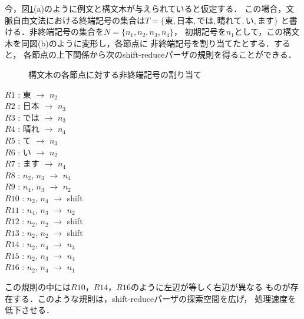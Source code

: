 今，図\ref{zu1}(a)のように例文と構文木が与えられていると仮定する．
この場合，文脈自由文法における終端記号の集合は$T=\{東, 日本, では, 
晴れて, い, ます\}$
と書ける．非終端記号の集合を$N=\{n_1, n_2, n_3, n_4\}$，
\hspace*{-1mm}初期記号を$n_1$として，\hspace*{-1mm}この構文木を同図(b)のように変形し，各節点に
非終端記号を割り当てたとする．すると，
各節点の上下関係から次のshift-reduceパーザの規則を得ることができる\cite{yoko2}．
\newpage

\begin{figure}
\begin{center}
\end{center}
\caption{構文木の各節点に対する非終端記号の割り当て} \label{zu1}
\end{figure}

\begin{center}
\begin{minipage}[t]{6cm}
\begin{flushleft}
\baselineskip=15pt
\smallskip
$R1$ : 東 $\rightarrow$ $n_2$ \\
$R2$ : 日本 $\rightarrow$ $n_3$ \\
$R3$ : では $\rightarrow$ $n_3$ \\
$R4$ : 晴れ $\rightarrow$ $n_4$ \\
$R5$ : て $\rightarrow$ $n_3$ \\
$R6$ : い $\rightarrow$ $n_2$ \\
$R7$ : ます $\rightarrow$ $n_4$ \\
$R8$ : $n_2$, $n_3$ $\rightarrow$ $n_4$ \\
$R9$ : $n_4$, $n_3$ $\rightarrow$ $n_2$ \\
$R10$ : $n_2$, $n_4$ $\rightarrow$ shift \\
$R11$ : $n_4$, $n_3$ $\rightarrow$ $n_2$ \\
$R12$ : $n_2$, $n_2$ $\rightarrow$ shift \\
$R13$ : $n_2$, $n_2$ $\rightarrow$ shift \\
$R14$ : $n_2$, $n_4$ $\rightarrow$ $n_3$ \\
$R15$ : $n_2$, $n_3$ $\rightarrow$ $n_4$ \\
$R16$ : $n_2$, $n_4$ $\rightarrow$ $n_1$ \\
\end{flushleft}
\end{minipage}
\end{center}

この規則の中には$R10$，$R14$，$R16$のように左辺が等しく右辺が異なる
ものが存在する．このような規則は，shift-reduceパーザの探索空間を広げ，
処理速度を低下させる．

